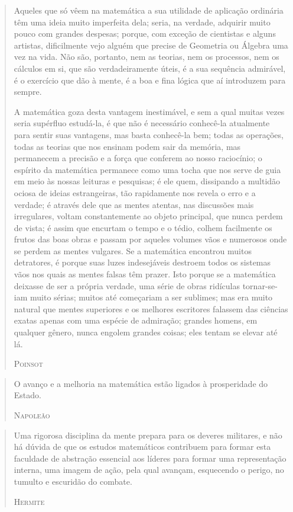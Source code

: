 \documentclass{hipatia}
\begin{document}
\begin{quote}
Aqueles que só vêem na matemática a sua utilidade de aplicação ordinária têm uma ideia muito imperfeita dela; seria, na verdade, adquirir muito pouco com grandes despesas; porque, com exceção de cientistas e alguns artistas, dificilmente vejo alguém que precise de Geometria ou Álgebra uma vez na vida. Não são, portanto, nem as teorias, nem os processos, nem os cálculos em si, que são verdadeiramente úteis, é a sua sequência admirável, é o exercício que dão à mente, é a boa e fina lógica que aí introduzem para sempre.

A matemática goza desta vantagem inestimável, e sem a qual muitas vezes seria supérfluo estudá-la, é que não é necessário conhecê-la atualmente para sentir suas vantagens, mas basta conhecê-la bem; todas as operações, todas as teorias que nos ensinam podem sair da memória, mas permanecem a precisão e a força que conferem ao nosso raciocínio; o espírito da matemática permanece como uma tocha que nos serve de guia em meio às nossas leituras e pesquisas; é ele quem, dissipando a multidão ociosa de ideias estrangeiras, tão rapidamente nos revela o erro e a verdade; é através dele que as mentes atentas, nas discussões mais irregulares, voltam constantemente ao objeto principal, que nunca perdem de vista; é assim que encurtam o tempo e o tédio, colhem facilmente os frutos das boas obras e passam por aqueles volumes vãos e numerosos onde se perdem as mentes vulgares. Se a matemática encontrou muitos detratores, é porque suas luzes indesejáveis destroem todos os sistemas vãos nos quais as mentes falsas têm prazer. Isto porque se a matemática deixasse de ser a própria verdade, uma série de obras ridículas tornar-se-iam muito sérias; muitos até começariam a ser sublimes; mas era muito natural que mentes superiores e os melhores escritores falassem das ciências exatas apenas com uma espécie de admiração; grandes homens, em qualquer gênero, nunca engolem grandes coisas; eles tentam se elevar até lá.

\hfill \textsc{Poinsot}
\end{quote}

\begin{quote}
O avanço e a melhoria na matemática estão ligados à prosperidade do Estado.

\hfill \textsc{Napoleão}
\end{quote}

\begin{quote}
Uma rigorosa disciplina da mente prepara para os deveres militares, e não há dúvida de que os estudos matemáticos contribuem para formar esta faculdade de abstração essencial aos líderes para formar uma representação interna, uma imagem de ação, pela qual avançam, esquecendo o perigo, no tumulto e escuridão do combate.

\hfill \textsc{Hermite}
\end{quote}
 
\end{document}
